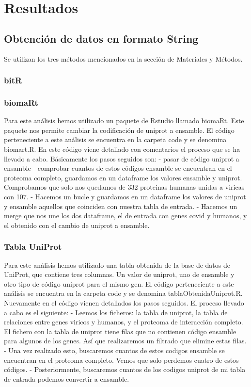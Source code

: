 
\section{Resultados}


\subsection{Obtención de datos en formato String}
Se utilizan los tres métodos mencionados en la sección de Materiales y Métodos.

\subsubsection{bitR}


\subsubsection{biomaRt}
Para este análisis hemos utilizado un paquete de Rstudio llamado biomaRt. Este paquete nos permite cambiar la codificación de uniprot a ensamble.
El código perteneciente a este análisis se encuentra en la carpeta code y se denomina biomart.R. En este código viene detallado con comentarios el
proceso que se ha llevado a cabo. Básicamente los pasos seguidos son: 
- pasar de código uniprot a ensamble
- comprobar cuantos de estos códigos ensamble se encuentran en el proteoma completo, guardamos en un dataframe los valores ensamble y uniprot.  Comprobamos que solo nos quedamos de 332 proteinas humanas unidas a viricas con 107.
- Hacemos un bucle y guardamos en un dataframe los valores de uniprot y ensamble aquellos que coinciden con nuestra tabla de entrada.
- Hacemos un merge que nos une los dos dataframe, el de entrada con genes covid y humanos, y el obtenido con el cambio de uniprot a ensamble. 


\subsubsection{Tabla UniProt}
Para este análisis hemos utilizado una tabla obtenida de la base de datos de UniProt, que contiene tres columnas. Un valor de uniprot, uno de ensamble y otro tipo de código uniprot para el mismo gen. 
El código perteneciente a este análisis se encuentra en la carpeta code y se denomina tablaObtenidaUniprot.R. Nuevamente en el código vienen detallados los pasos seguidos. 
El proceso llevado a cabo es el siguiente:
- Leemos los ficheros: la tabla de uniprot, la tabla de relaciones entre genes viricos y humanos, y el proteoma de interacción completo. El fichero con la tabla de uniprot tiene filas que no contienen código ensamble para algunos de los genes. Así que realizaremos un filtrado que elimine estas filas.
- Una vez realizado esto, buscaremos cuantos de estos codigos ensamble se encuentran en el proteoma completo. Vemos que solo perdemos cuatro de estos códigos.
- Posteriormente, buscaremos cuantos de los codigos uniprot de mi tabla de entrada podemos convertir a ensamble. 


